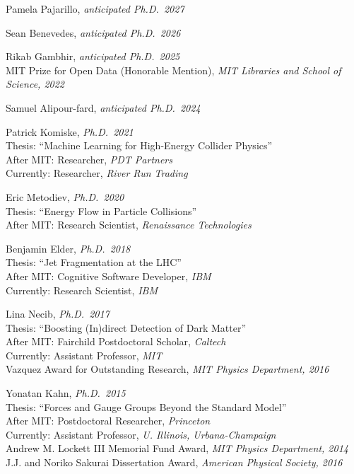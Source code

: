 \bbl

\item Pamela Pajarillo, \emph{anticipated Ph.D.~2027}

\item Sean Benevedes, \emph{anticipated Ph.D.~2026}

\item Rikab Gambhir, \emph{anticipated Ph.D.~2025}
\\ \sh MIT Prize for Open Data (Honorable Mention), \emph{MIT Libraries and School of Science, 2022}

\item Samuel Alipour-fard, \emph{anticipated Ph.D.~2024}

\item Patrick Komiske, \emph{Ph.D.~2021}
\\ \sh Thesis: ``Machine Learning for High-Energy Collider Physics''
\\ \sh After MIT: Researcher, \emph{PDT Partners}
\\ \sh Currently: Researcher, \emph{River Run Trading}

\item Eric Metodiev, \emph{Ph.D.~2020}
\\ \sh Thesis: ``Energy Flow in Particle Collisions''
\\ \sh After MIT: Research Scientist, \emph{Renaissance Technologies}

\item Benjamin Elder, \emph{Ph.D.~2018}
\\ \sh Thesis: ``Jet Fragmentation at the LHC''
\\ \sh After MIT: Cognitive Software Developer, \emph{IBM}
\\ \sh Currently: Research Scientist, \emph{IBM}

\item Lina Necib, \emph{Ph.D.~2017}
\\ \sh Thesis: ``Boosting (In)direct Detection of Dark Matter''
\\ \sh After MIT: Fairchild Postdoctoral Scholar, \emph{Caltech}
\\ \sh Currently: Assistant Professor, \emph{MIT}
\\ \sh Vazquez Award for Outstanding Research, \emph{MIT Physics Department, 2016}

\item Yonatan Kahn, \emph{Ph.D.~2015}
\\ \sh Thesis: ``Forces and Gauge Groups Beyond the Standard Model''
\\ \sh After MIT: Postdoctoral Researcher, \emph{Princeton}
\\ \sh Currently: Assistant Professor, \emph{U. Illinois, Urbana-Champaign}
\\ \sh Andrew M. Lockett III Memorial Fund Award, \emph{MIT Physics Department, 2014}
\\ \sh J.J. and Noriko Sakurai Dissertation Award, \emph{American Physical Society, 2016}

